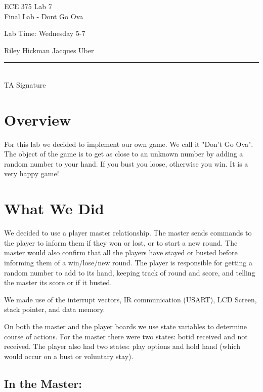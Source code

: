 \documentclass[10pt,letterpaper]{article}
\begin{document}
\begin{titlepage}
    \vspace*{4cm}
    \begin{flushright}
    {\huge
        ECE 375 Lab 7\\[1cm]
    }
    {\large
        Final Lab - Dont Go Ova
    }
    \end{flushright}
    \begin{flushleft}
    Lab Time: Wednesday 5-7
    \end{flushleft}
    \begin{flushright}
    Riley Hickman
    Jacques Uber
    \vfill
    \rule{5in}{.5mm}\\
    TA Signature
    \end{flushright}

\end{titlepage}



\section{Overview}
For this lab we decided to implement our own game. We call it "Don't Go Ova". The object of the game is to get as close to an unknown number by adding a random number to your hand. If you bust you loose, otherwise you win. It is a very happy game!

\section{What We Did}
We decided to use a player master relationship. The master sends commands to the player to inform them if they won or lost, or to start a new round. The master would also confirm that all the players have stayed or busted before informing them of a win/lose/new round. The player is responsible for getting a random number to add to its hand, keeping track of round and score, and telling the master its score or if it busted.

We made use of the interrupt vectors, IR communication (USART), LCD Screen, stack pointer, and data memory.

On both the master and the player boards we use state variables to determine course of actions. For the master there were two states: botid received and not received. The player also had two states: play options and hold hand (which would occur on a bust or voluntary stay).

\subsection{In the Master:}
\end{document}
